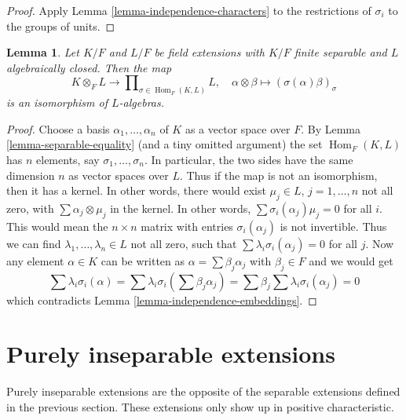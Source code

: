 \documentclass{stacks-project}
\theoremstyle{plain}
\newtheorem{lemma}[subsection]{Lemma}
\theoremstyle{definition}
\theoremstyle{remark}
\numberwithin{equation}{subsection}
\def\Hom{\mathop{\mathrm{Hom}}\nolimits}
\begin{document}
\begin{proof}
Apply Lemma \ref{lemma-independence-characters} to
the restrictions of $\sigma_i$ to the groups of units.
\end{proof}

\begin{lemma}
\label{lemma-finite-separable-tensor-alg-closed}
Let $K/F$ and $L/F$ be field extensions with
$K/F$ finite separable and $L$ algebraically closed.
Then the map
$$
K \otimes_F L
\longrightarrow
\prod\nolimits_{\sigma \in \Hom_F(K, L)} L,\quad
\alpha \otimes \beta \mapsto (\sigma(\alpha)\beta)_\sigma
$$
is an isomorphism of $L$-algebras.
\end{lemma}

\begin{proof}
Choose a basis $\alpha_1, \ldots, \alpha_n$ of $K$ as a vector space over $F$.
By Lemma \ref{lemma-separable-equality} (and a tiny omitted argument) the set
$\Hom_F(K, L)$ has $n$ elements, say $\sigma_1, \ldots, \sigma_n$.
In particular, the two sides have the same dimension $n$ as vector
spaces over $L$. Thus if the map is not an isomorphism, then it
has a kernel. In other words, there would exist
$\mu_j \in L$, $j = 1, \ldots, n$ not all zero,
with $\sum \alpha_j \otimes \mu_j$ in the kernel.
In other words, $\sum \sigma_i(\alpha_j)\mu_j = 0$ for all $i$.
This would mean the $n \times n$ matrix with entries
$\sigma_i(\alpha_j)$ is not invertible. Thus we can find
$\lambda_1, \ldots, \lambda_n \in L$ not all zero,
such that $\sum \lambda_i\sigma_i(\alpha_j) = 0$ for all $j$.
Now any element $\alpha \in K$ can be written as
$\alpha = \sum \beta_j \alpha_j$ with $\beta_j \in F$ and we would get
$$
\sum \lambda_i\sigma_i(\alpha) =
\sum \lambda_i\sigma_i(\sum \beta_j \alpha_j) =
\sum \beta_j \sum \lambda_i\sigma_i(\alpha_j) = 0
$$
which contradicts Lemma \ref{lemma-independence-embeddings}.
\end{proof}







\section{Purely inseparable extensions}
\label{section-purely-inseparable}

\noindent
Purely inseparable extensions are the opposite of the separable
extensions defined in the previous section. These extensions only
show up in positive characteristic.
\end{document}
